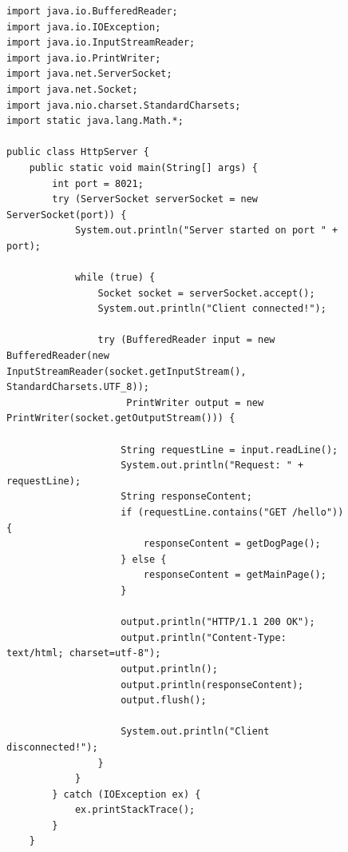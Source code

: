 \documentclass[a4paper, 14pt]{extarticle}
\begin{document}
\begin{figure}[!htb]
\begin{lstlisting}[language={},caption={HttpServer.java},label={lst:code1}]
import java.io.BufferedReader;
import java.io.IOException;
import java.io.InputStreamReader;
import java.io.PrintWriter;
import java.net.ServerSocket;
import java.net.Socket;
import java.nio.charset.StandardCharsets;
import static java.lang.Math.*;

public class HttpServer {
    public static void main(String[] args) {
        int port = 8021;
        try (ServerSocket serverSocket = new ServerSocket(port)) {
            System.out.println("Server started on port " + port);

            while (true) {
                Socket socket = serverSocket.accept();
                System.out.println("Client connected!");

                try (BufferedReader input = new BufferedReader(new InputStreamReader(socket.getInputStream(), StandardCharsets.UTF_8));
                     PrintWriter output = new PrintWriter(socket.getOutputStream())) {

                    String requestLine = input.readLine();
                    System.out.println("Request: " + requestLine);
                    String responseContent;
                    if (requestLine.contains("GET /hello")) {
                        responseContent = getDogPage();
                    } else {
                        responseContent = getMainPage();
                    }

                    output.println("HTTP/1.1 200 OK");
                    output.println("Content-Type: text/html; charset=utf-8");
                    output.println();
                    output.println(responseContent);
                    output.flush();

                    System.out.println("Client disconnected!");
                }
            }
        } catch (IOException ex) {
            ex.printStackTrace();
        }
    }


\end{lstlisting}
\end{figure}
\newpage
\end{document}
